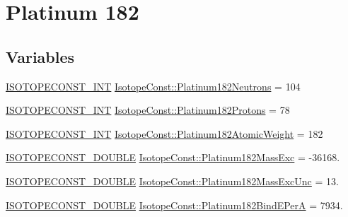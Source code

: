 \hypertarget{group___isotope_const-_platinum-_pt182}{}\section{Platinum 182}
\label{group___isotope_const-_platinum-_pt182}
\subsection*{Variables}
\begin{DoxyCompactItemize}
\item 
\mbox{\hyperlink{group___isotope_const-_macros_ga5f18360b3e99483a35c32d789e62621c}{I\+S\+O\+T\+O\+P\+E\+C\+O\+N\+S\+T\+\_\+\+I\+NT}} \mbox{\hyperlink{group___isotope_const-_platinum-_pt182_ga6bd480da03d992a17b9b78d0be4234d4}{Isotope\+Const\+::\+Platinum182\+Neutrons}} = 104
\item 
\mbox{\hyperlink{group___isotope_const-_macros_ga5f18360b3e99483a35c32d789e62621c}{I\+S\+O\+T\+O\+P\+E\+C\+O\+N\+S\+T\+\_\+\+I\+NT}} \mbox{\hyperlink{group___isotope_const-_platinum-_pt182_ga3bfa405b0665ea05d22105826a8b123f}{Isotope\+Const\+::\+Platinum182\+Protons}} = 78
\item 
\mbox{\hyperlink{group___isotope_const-_macros_ga5f18360b3e99483a35c32d789e62621c}{I\+S\+O\+T\+O\+P\+E\+C\+O\+N\+S\+T\+\_\+\+I\+NT}} \mbox{\hyperlink{group___isotope_const-_platinum-_pt182_ga3c77eef263e6f941e914ed51ab9d9b35}{Isotope\+Const\+::\+Platinum182\+Atomic\+Weight}} = 182
\item 
\mbox{\hyperlink{group___isotope_const-_macros_ga8f45a7272ce02c0b4c65c44636ed719a}{I\+S\+O\+T\+O\+P\+E\+C\+O\+N\+S\+T\+\_\+\+D\+O\+U\+B\+LE}} \mbox{\hyperlink{group___isotope_const-_platinum-_pt182_ga5b686b8757c7a208b72df15780531f95}{Isotope\+Const\+::\+Platinum182\+Mass\+Exc}} = -\/36168.
\item 
\mbox{\hyperlink{group___isotope_const-_macros_ga8f45a7272ce02c0b4c65c44636ed719a}{I\+S\+O\+T\+O\+P\+E\+C\+O\+N\+S\+T\+\_\+\+D\+O\+U\+B\+LE}} \mbox{\hyperlink{group___isotope_const-_platinum-_pt182_gac2925db26f2eb1509c0f19479f447f98}{Isotope\+Const\+::\+Platinum182\+Mass\+Exc\+Unc}} = 13.
\item 
\mbox{\hyperlink{group___isotope_const-_macros_ga8f45a7272ce02c0b4c65c44636ed719a}{I\+S\+O\+T\+O\+P\+E\+C\+O\+N\+S\+T\+\_\+\+D\+O\+U\+B\+LE}} \mbox{\hyperlink{group___isotope_const-_platinum-_pt182_gad8df44c1eecac2641069e079f10b7d66}{Isotope\+Const\+::\+Platinum182\+Bind\+E\+PerA}} = 7934.
\item 

\end{DoxyCompactItemize}
